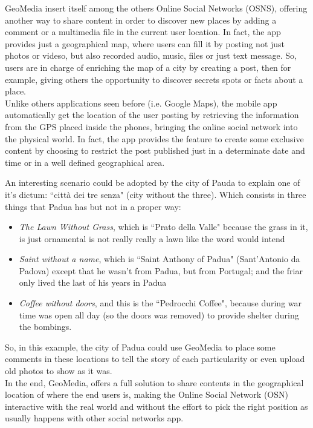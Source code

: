 \documentclass[conference]{IEEEtran}
\begin{document}
GeoMedia insert itself among the others Online Social Networks (OSNS), offering another way to share content in order to discover new places by adding a comment or a multimedia file in the current user location.
In fact, the app provides just a geographical map, where users can fill it by posting
not just photos or videso, but also recorded audio, music, files or just text message.
So, users are in charge of enriching the map of a city by creating a post, then for example, giving others the opportunity to discover secrets spots or facts about a place.
\\
Unlike others applications seen before (i.e. Google Maps), the mobile app automatically get the location of the user posting by retrieving the information from the GPS placed inside the phones, bringing the online social network into the physical world. In fact, the app provides the feature to create some exclusive content by choosing to restrict the post published just in a determinate date and time or in a well defined geographical area.

An interesting scenario could be adopted by the city of Pauda to explain one of it's dictum: ``città dei tre senza" (city without the three).
Which consists in three things that Padua has but not in a proper way:
\begin{itemize}
    \item \textit{The Lawn Without Grass}, which is ``Prato della Valle" because the grass in it, is just ornamental is not really really a lawn like the word would intend
    \item \textit{Saint without a name}, which is ``Saint Anthony of Padua" (Sant'Antonio da Padova) except that he wasn't from Padua, but from Portugal; and the friar only lived the last of his years in Padua
    \item \textit{Coffee without doors}, and this is the ``Pedrocchi Coffee", because during war time was open all day (so the doors was removed) to provide shelter during the bombings.
\end{itemize}
So, in this example, the city of Padua could use GeoMedia to place some comments in these locations to tell the story of each particularity or even upload old photos to show as it was.
\\


In the end, GeoMedia, offers a full solution to share contents in the geographical location of where the end users is, making the Online Social Network (OSN) interactive with the real world and without the effort to pick the right position as usually happens with other social networks app.
\end{document}

